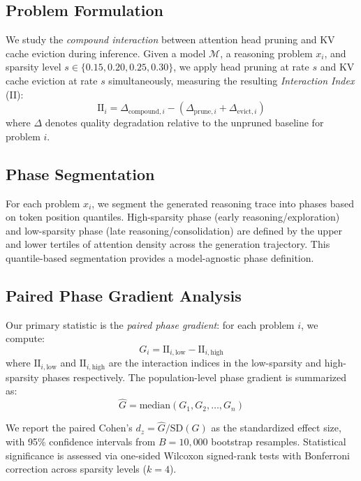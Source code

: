 \documentclass[11pt,a4paper]{article}
\begin{document}
\subsection{Problem Formulation}

We study the \emph{compound interaction} between attention head pruning and KV cache eviction during inference. Given a model $\mathcal{M}$, a reasoning problem $x_i$, and sparsity level $s \in \{0.15, 0.20, 0.25, 0.30\}$, we apply head pruning at rate $s$ and KV cache eviction at rate $s$ simultaneously, measuring the resulting \emph{Interaction Index} (II):
\begin{equation}
\text{II}_i = \Delta_{\text{compound},i} - (\Delta_{\text{prune},i} + \Delta_{\text{evict},i})
\end{equation}
where $\Delta$ denotes quality degradation relative to the unpruned baseline for problem $i$.

\subsection{Phase Segmentation}

For each problem $x_i$, we segment the generated reasoning trace into phases based on token position quantiles. High-sparsity phase (early reasoning/exploration) and low-sparsity phase (late reasoning/consolidation) are defined by the upper and lower tertiles of attention density across the generation trajectory. This quantile-based segmentation provides a model-agnostic phase definition.

\subsection{Paired Phase Gradient Analysis}

Our primary statistic is the \emph{paired phase gradient}: for each problem $i$, we compute:
\begin{equation}
G_i = \text{II}_{i,\text{low}} - \text{II}_{i,\text{high}}
\end{equation}
where $\text{II}_{i,\text{low}}$ and $\text{II}_{i,\text{high}}$ are the interaction indices in the low-sparsity and high-sparsity phases respectively. The population-level phase gradient is summarized as:
\begin{equation}
\hat{G} = \text{median}(G_1, G_2, \ldots, G_n)
\end{equation}

We report the paired Cohen's $d_z = \hat{G} / \text{SD}(G)$ as the standardized effect size, with 95\% confidence intervals from $B = 10{,}000$ bootstrap resamples. Statistical significance is assessed via one-sided Wilcoxon signed-rank tests with Bonferroni correction across sparsity levels ($k = 4$).
\end{document}
